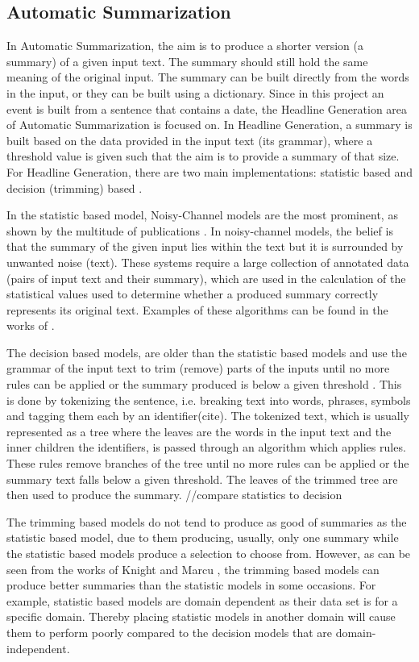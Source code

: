 \subsection{Automatic Summarization}
\par In Automatic Summarization, the aim is to produce a shorter version (a summary) of a given input text. The summary should still hold the same meaning of the original input. The summary can be built directly from the words in the input, or they can be built using a dictionary. Since in this project an event is built from a sentence that contains a date, the Headline Generation area of Automatic Summarization is focused on. In Headline Generation, a summary is built based on the data provided in the input text (its grammar), where a threshold value is given such that the aim is to provide a summary of that size. For Headline Generation, there are two main implementations: statistic based and decision (trimming) based \cite{daumemarcu2002}.
\par In the statistic based model, Noisy-Channel models are the most prominent, as shown by the multitude of publications \cite{daumemarcu2002,rushchopraweston2015,chopraaulirush2016}. In noisy-channel models, the belief is that the summary of the given input lies within the text but it is surrounded by unwanted noise (text). These systems require a large collection of annotated data (pairs of input text and their summary), which are used in the calculation of the statistical values used to determine whether a produced summary correctly represents its original text. Examples of these algorithms can be found in the works of \cite{daumemarcu2002,knightmarcu2000}.
\par The decision based models, are older than the statistic based models and use the grammar of the input text to trim (remove) parts of the inputs until no more rules can be applied or the summary produced is below a given threshold \cite{dorrzajicschwartz2003}. This is done by tokenizing the sentence, i.e. breaking text into words, phrases, symbols and tagging them each by an identifier(cite). The tokenized text, which is usually represented as a tree where the leaves are the words in the input text and the inner children the identifiers, is passed through an algorithm which applies rules. These rules remove branches of the tree until no more rules can be applied or the summary text falls below a given threshold. The leaves of the trimmed tree are then used to produce the summary.
//compare statistics to decision
\par The trimming based models do not tend to produce as good of summaries as the statistic based model, due to them producing, usually, only one summary while the statistic based models produce a selection to choose from. However, as can be seen from the works of Knight and Marcu \cite{knightmarcu2000}, the trimming based models can produce better summaries than the statistic models in some occasions. For example, statistic based models are domain dependent as their data set is for a specific domain. Thereby placing statistic models in another domain will cause them to perform poorly compared to the decision models that are domain-independent. 
